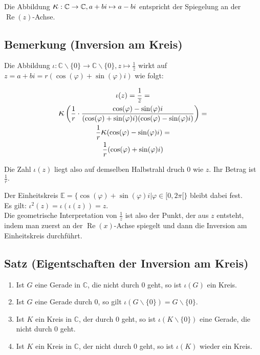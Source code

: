 	Die Abbildung  $\mathlll{\kappa}: \mathbb{C}\rightarrow\mathbb{C},a+bi\mapsto a-bi$ entspricht der Spiegelung an der $\operatorname{Re}(z)$-Achse.
	
	
\subsection[Inversion am Kreis]{Bemerkung (Inversion am Kreis)}


	Die Abbildung $\iota:\mathbb{C}\backslash\{0\}\rightarrow\mathbb{C}\backslash\{0\},
	z\mapsto \frac{1}{\overline{z}}$ wirkt auf $z=a+bi=r(\cos(\varphi)+\sin(\varphi)i)$ wie folgt:
	
	\begin{equation*}
	\begin{gathered}
	\iota(z)=\frac{1}{\overline{z}}=\\
	\mathll{\kappa}\left( \frac{1}{r}\cdot \frac{\cos(\varphi)-\sin(\varphi)i}{(\cos(\varphi)+\sin(\varphi)i)
	(\cos(\varphi)-\sin(\varphi)i)}  \right)=\\
	\frac{1}{r}\mathll{\kappa}(\cos(\varphi)-\sin(\varphi)i)=\\
	\frac{1}{r}(\cos(\varphi)+\sin(\varphi)i)	
	\end{gathered}
	\end{equation*}
	
	Die Zahl $\iota(z)$ liegt also auf demselben Halbstrahl druch 0 wie $z$. Ihr Betrag ist $\frac{1}{r}.$
	\\ \newline
	
	Der Einheitskreis $\mathbb{E}=\{\cos(\varphi)+\sin(\varphi)i|\varphi\in [0,2\pi [\}$ bleibt dabei fest.\\
	\newline
	Es gilt: $\iota^2(z)=\iota(\iota(z))=z$.\\ \newline
	Die geometrische Interpretation von $\frac{1}{z}$ ist also der Punkt, der aus $z$ entsteht, 
	indem man zuerst an der $\operatorname{Re}(x)$-Achse spiegelt und dann die Inversion am 
	Einheitskreis durchführt.
	
	
\subsection[Eigentschaften der Inversion am Kreis]{Satz (Eigentschaften der Inversion am Kreis)}

	\begin{enumerate}
	\item Ist $G$ eine Gerade in $\mathbb{C}$, die nicht durch 0 geht, so ist $\iota(G)$ ein Kreis.
	\item Ist $G$ eine Gerade durch 0, so gilt $\iota(G\backslash\{0\})=G\backslash\{0\}$.
	\item Ist $K$ ein Kreis in $\mathbb{C}$, der durch 0 geht, so ist $\iota(K\backslash\{0\})$ eine Gerade,
	die nicht durch 0 geht.
	\item Ist $K$ ein Kreis in $\mathbb{C}$, der nicht durch 0 geht, so ist $\iota(K)$ wieder ein Kreis.
	\end{enumerate}


